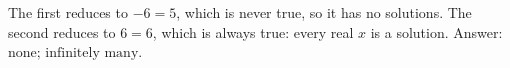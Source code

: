 The first reduces to $-6=5$, which is never true, so it has no solutions. The second reduces to $6=6$, which is always true: every real $x$ is a solution. Answer: $\boxed{\text{none; infinitely many}}$.
